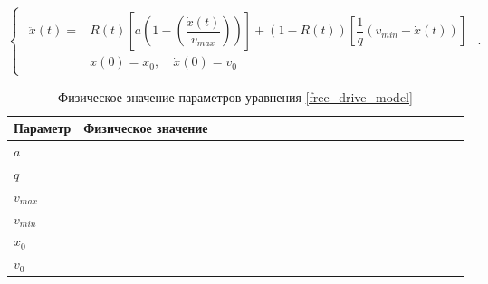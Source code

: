 \documentclass[12pt, a4paper]{extarticle}
\numberwithin{equation}{section}
\begin{document}
\begin{equation} \label{free_drive_model}
\begin{cases}
\begin{split}
\ddot{x}(t) = &R(t) \left[ a\left( 1-\left( \dfrac{\dot{x}(t)}{v_{max}}\right) \right)\right] + (1-R(t))\left[  \dfrac{1}{q}\left( v_{min} - \dot{x}(t)\right) \right]  \\
&x(0)=x_0, \quad \dot{x}(0)=v_{0}
\end{split}
\end{cases}.
\end{equation}

\begin{table}[h!]
	\caption{Физическое значение параметров уравнения \eqref{free_drive_model}}
	\label{free_drive_parameters}
	\begin{center}
		\begin{tabularx}{\textwidth}{p{0.15\linewidth}p{0.85\linewidth}}			
			\hline
			\rule{0cm}{0,5cm}
			Параметр &  Физическое значение \\ 
			[3pt]\hline
			$a$ &\\
			$q$ &\\ 
			$v_{max}$ &\\
			$v_{min}$ &\\ 
			$x_0$ &\\
			$v_0$ &\\ 
			\hline
		\end{tabularx}
	\end{center}
\end{table}
\end{document}
